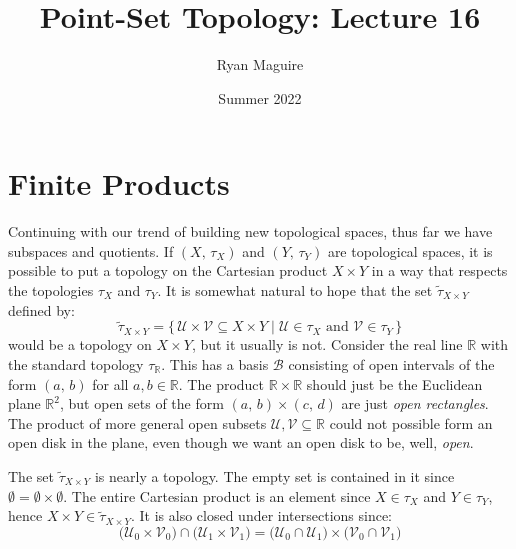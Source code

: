 \documentclass{article}
\title{Point-Set Topology: Lecture 16}
\author{Ryan Maguire}
\date{Summer 2022}
\theoremstyle{plain}
\theoremstyle{normal}
\begin{document}
    \maketitle
    \section{Finite Products}
        Continuing with our trend of building new topological spaces, thus far
        we have subspaces and quotients. If $(X,\,\tau_{X})$ and
        $(Y,\,\tau_{Y})$ are topological spaces, it is possible to put a
        topology on the Cartesian product $X\times{Y}$ in a way that respects
        the topologies $\tau_{X}$ and $\tau_{Y}$. It is somewhat natural to hope
        that the set $\tilde{\tau}_{X\times{Y}}$ defined by:
        \begin{equation}
            \tilde{\tau}_{X\times{Y}}=
            \{\,\mathcal{U}\times\mathcal{V}\subseteq{X}\times{Y}\;|\;
                \mathcal{U}\in\tau_{X}\textrm{ and }\mathcal{V}\in\tau_{Y}\,\}
        \end{equation}
        would be a topology on $X\times{Y}$, but it usually is not. Consider the
        real line $\mathbb{R}$ with the standard topology $\tau_{\mathbb{R}}$.
        This has a basis $\mathcal{B}$ consisting of open intervals of the
        form $(a,\,b)$ for all $a,b\in\mathbb{R}$. The product
        $\mathbb{R}\times\mathbb{R}$ should just be the Euclidean plane
        $\mathbb{R}^{2}$, but open sets of the form $(a,\,b)\times(c,\,d)$ are
        just \textit{open rectangles}. The product of more general open subsets
        $\mathcal{U},\mathcal{V}\subseteq\mathbb{R}$ could not possible form an
        open disk in the plane, even though we want an open disk to be, well,
        \textit{open}.
        \par\hfill\par
        The set $\tilde{\tau}_{X\times{Y}}$ is
        nearly a topology. The empty set is contained in it since
        $\emptyset=\emptyset\times\emptyset$. The entire Cartesian product is
        an element since $X\in\tau_{X}$ and $Y\in\tau_{Y}$, hence
        $X\times{Y}\in\tilde{\tau}_{X\times{Y}}$. It is also closed under
        intersections since:
        \begin{equation}
            \big(\mathcal{U}_{0}\times\mathcal{V}_{0}\big)\cap
            \big(\mathcal{U}_{1}\times\mathcal{V}_{1}\big)
            =\big(\mathcal{U}_{0}\cap\mathcal{U}_{1}\big)\times
            \big(\mathcal{V}_{0}\cap\mathcal{V}_{1}\big)
        \end{equation}
\end{document}
